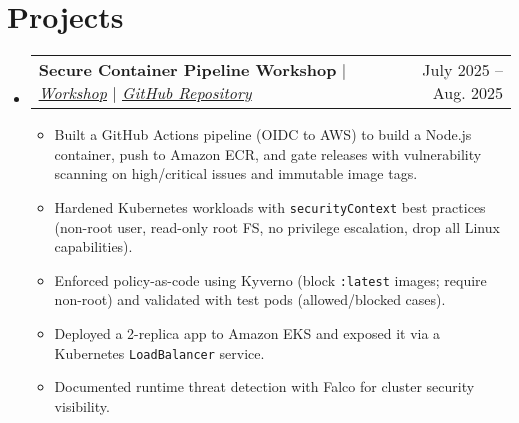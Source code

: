 \documentclass[a4paper,12pt]{article}
\makeatletter
\newcommand{\resumeItem}[1]{
  \item\small{
    {#1 \vspace{-2pt}}
  }
}
\newcommand{\resumeProjectHeading}[2]{
    \item
    \begin{tabular*}{0.97\textwidth}{l@{\extracolsep{\fill}}r}
      \small#1 & #2 \\
    \end{tabular*}\vspace{-7pt}
}
\newcommand{\resumeSubHeadingListStart}{\begin{itemize}[leftmargin=0.15in, label={}]}
\newcommand{\resumeSubHeadingListEnd}{\end{itemize}}
\newcommand{\resumeItemListStart}{\begin{itemize}}
\newcommand{\resumeItemListEnd}{\end{itemize}\vspace{-5pt}}
\makeatother
\begin{document}
\section{Projects}
\resumeSubHeadingListStart
\resumeProjectHeading
{\textbf{Secure Container Pipeline Workshop} $|$ \emph{\href{https://powoftech.github.io/secure-container-pipeline-workshop/}{\underline{Workshop}}} $|$ \emph{\href{https://github.com/powoftech/secure-container-pipeline-workshop}{\underline{GitHub Repository}}}}{July 2025 -- Aug. 2025}
\resumeItemListStart
\resumeItem{Built a GitHub Actions pipeline (OIDC to AWS) to build a Node.js container, push to Amazon ECR, and gate releases with vulnerability scanning on high/critical issues and immutable image tags.}
\resumeItem{Hardened Kubernetes workloads with \texttt{securityContext} best practices (non-root user, read-only root FS, no privilege escalation, drop all Linux capabilities).}
\resumeItem{Enforced policy-as-code using Kyverno (block \texttt{:latest} images; require non-root) and validated with test pods (allowed/blocked cases).}
\resumeItem{Deployed a 2-replica app to Amazon EKS and exposed it via a Kubernetes \texttt{LoadBalancer} service.}
\resumeItem{Documented runtime threat detection with Falco for cluster security visibility.}
\resumeItemListEnd
{}
\resumeSubHeadingListEnd

\end{document}
